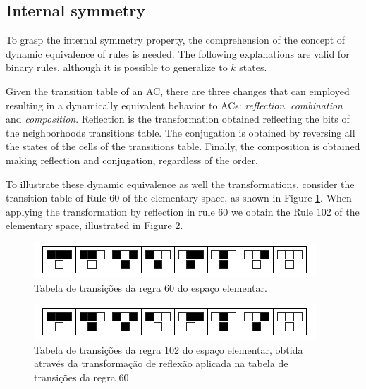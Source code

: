 \documentclass[12pt, a4paper]{article}
\begin{document}
\subsection{Internal symmetry}
To grasp the internal symmetry property, the comprehension of the concept of dynamic equivalence of rules is needed. The following explanations are valid for binary rules, although it is possible to generalize to $k$ states.


Given the transition table of an AC, there are three changes that can employed resulting in a dynamically equivalent behavior to ACs: \textit{reflection}, \textit{combination} and \textit{composition}. Reflection is the transformation obtained reflecting the bits of the neighborhoods transitions table. The conjugation is obtained by reversing all the states of the cells of the transitions table. Finally, the composition is obtained making reflection and conjugation, regardless of the order.

To illustrate these dynamic equivalence as well the transformations, consider the transition table of Rule 60 of the elementary space, as shown in Figure \ref{fig:table60}. When applying the transformation by reflection in rule 60 we obtain the Rule 102 of the elementary space, illustrated in Figure \ref{fig:table102}.

	\begin{figure}[h!]
	  \centering
	  \includegraphics[width=.5\textwidth]{fig_ruleIcon60.png}
	  \caption{Tabela de transições da regra 60 do espaço elementar.}
	  \label{fig:table60}
	\end{figure}

	\begin{figure}[h!]
	  \centering
	  \includegraphics[width=.5\textwidth]{fig_ruleIcon102.png}
	  \caption{Tabela de transições da regra 102 do espaço elementar, obtida através da transformação de reflexão aplicada na tabela de transições da regra 60.}
	  \label{fig:table102}
	\end{figure}

\end{document}

